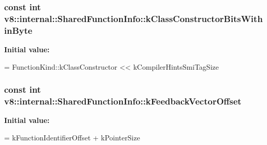 \subsubsection[{\texorpdfstring{k\+Class\+Constructor\+Bits\+Within\+Byte}{kClassConstructorBitsWithinByte}}]{\setlength{\rightskip}{0pt plus 5cm}const int v8\+::internal\+::\+Shared\+Function\+Info\+::k\+Class\+Constructor\+Bits\+Within\+Byte\hspace{0.3cm}{\ttfamily [static]}}\hypertarget{classv8_1_1internal_1_1_shared_function_info_a6817cc7a383284f038a33269e229769b}{}\label{classv8_1_1internal_1_1_shared_function_info_a6817cc7a383284f038a33269e229769b}
{\bfseries Initial value\+:}
\begin{DoxyCode}
=
      FunctionKind::kClassConstructor << kCompilerHintsSmiTagSize
\end{DoxyCode}
\subsubsection[{\texorpdfstring{k\+Feedback\+Vector\+Offset}{kFeedbackVectorOffset}}]{\setlength{\rightskip}{0pt plus 5cm}const int v8\+::internal\+::\+Shared\+Function\+Info\+::k\+Feedback\+Vector\+Offset\hspace{0.3cm}{\ttfamily [static]}}\hypertarget{classv8_1_1internal_1_1_shared_function_info_a4782b957fff7740b6b585b22bca50d55}{}\label{classv8_1_1internal_1_1_shared_function_info_a4782b957fff7740b6b585b22bca50d55}
{\bfseries Initial value\+:}
\begin{DoxyCode}
=
      kFunctionIdentifierOffset + kPointerSize
\end{DoxyCode}
